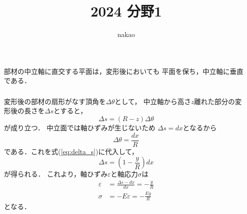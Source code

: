 \documentclass[a4paper]{jsarticle}
\begin{document}
\title{2024 分野1}
\author{nakao}
\maketitle

\section{}
\subsection{}
\subsubsection{}
部材の中立軸に直交する平面は，変形後においても
平面を保ち，中立軸に垂直である．
\subsubsection{}
変形後の部材の扇形がなす頂角を$\Delta \theta$として，
中立軸から高さ$z$離れた部分の変形後の長さを$\Delta s$とすると，
\begin{equation}
  \label{eq:delta_s}
  \Delta s = (R - z) \Delta \theta
\end{equation}
が成り立つ．
中立面では軸ひずみが生じないため
$\Delta s = dx$となるから
\begin{equation}
  \Delta \theta = \frac{dx}{R}
\end{equation}
である．これを式(\ref{eq:delta_s})に代入して，
\begin{equation}
  \Delta s = \left(1 - \frac{y}{R}\right) dx
\end{equation}
が得られる．
これより，軸ひずみ$\varepsilon$と軸応力$\sigma$は
\begin{align}
  \varepsilon & = \frac{\Delta s - dx}{dx} = -\frac{y}{R} \\
  \sigma      & = -E \varepsilon = - \frac{E y}{R}
\end{align}
となる．
\end{document}
